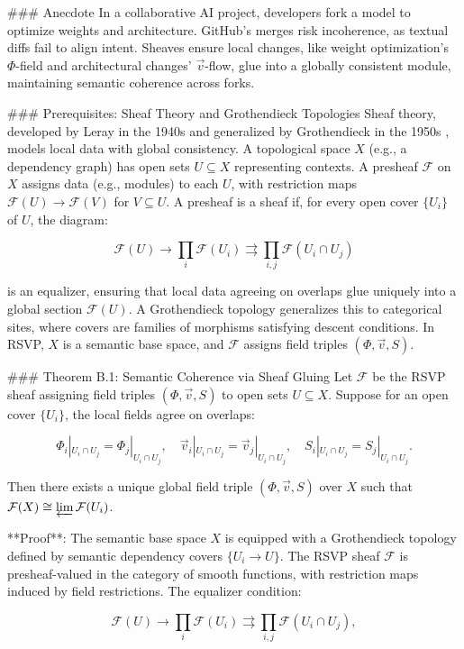 \documentclass[12pt]{article}
\begin{document}
{### Anecdote
In a collaborative AI project, developers fork a model to optimize weights and architecture. GitHub’s merges risk incoherence, as textual diffs fail to align intent. Sheaves ensure local changes, like weight optimization’s $\Phi$-field and architectural changes’ $\vec{v}$-flow, glue into a globally consistent module, maintaining semantic coherence across forks.

### Prerequisites: Sheaf Theory and Grothendieck Topologies
Sheaf theory, developed by Leray in the 1940s and generalized by Grothendieck in the 1950s \cite{mac2013categories}, models local data with global consistency. A topological space $X$ (e.g., a dependency graph) has open sets $U \subseteq X$ representing contexts. A presheaf $\mathcal{F}$ on $X$ assigns data (e.g., modules) to each $U$, with restriction maps $\mathcal{F}(U) \to \mathcal{F}(V)$ for $V \subseteq U$. A presheaf is a sheaf if, for every open cover $\{ U_i \}$ of $U$, the diagram:

\[
\mathcal{F}(U) \to \prod_i \mathcal{F}(U_i) \rightrightarrows \prod_{i,j} \mathcal{F}(U_i \cap U_j)
\]

is an equalizer, ensuring that local data agreeing on overlaps glue uniquely into a global section $\mathcal{F}(U)$. A Grothendieck topology generalizes this to categorical sites, where covers are families of morphisms satisfying descent conditions. In RSVP, $X$ is a semantic base space, and $\mathcal{F}$ assigns field triples $(\Phi, \vec{v}, S)$.

### Theorem B.1: Semantic Coherence via Sheaf Gluing
Let $\mathcal{F}$ be the RSVP sheaf assigning field triples $(\Phi, \vec{v}, S)$ to open sets $U \subseteq X$. Suppose for an open cover $\{ U_i \}$, the local fields agree on overlaps:

\[
\Phi_i|_{U_i \cap U_j} = \Phi_j|_{U_i \cap U_j}, \quad \vec{v}_i|_{U_i \cap U_j} = \vec{v}_j|_{U_i \cap U_j}, \quad S_i|_{U_i \cap U_j} = S_j|_{U_i \cap U_j}.
\]

Then there exists a unique global field triple $(\Phi, \vec{v}, S)$ over $X$ such that $\mathcal{F}(X) \cong \varprojlim \mathcal{F}(U_i)$.

**Proof**: The semantic base space $X$ is equipped with a Grothendieck topology defined by semantic dependency covers $\{ U_i \to U \}$. The RSVP sheaf $\mathcal{F}$ is presheaf-valued in the category of smooth functions, with restriction maps induced by field restrictions. The equalizer condition:

\[
\mathcal{F}(U) \to \prod_i \mathcal{F}(U_i) \rightrightarrows \prod_{i,j} \mathcal{F}(U_i \cap U_j),
\]

}
\end{document}
